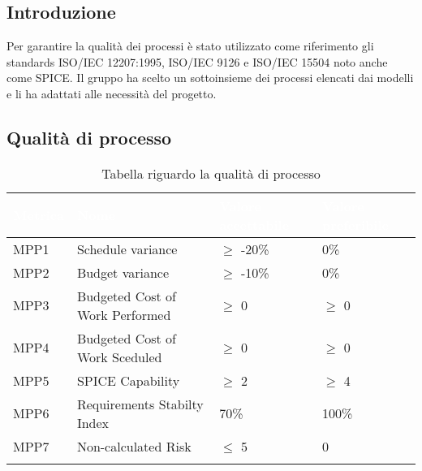 \subsection{Introduzione}
Per garantire la qualità dei processi è stato utilizzato come riferimento gli standards 
ISO/IEC 12207:1995, ISO/IEC 9126 e ISO/IEC 15504 noto anche come SPICE.
Il gruppo ha scelto un sottoinsieme dei processi elencati dai modelli e li ha adattati alle 
necessità del progetto.

\subsection{Qualità di processo}
{

    \setlength{\freewidth}{\dimexpr\textwidth-10\tabcolsep}
    \renewcommand{\arraystretch}{1.5}
    \centering
    \setlength{\aboverulesep}{0pt}
    \setlength{\belowrulesep}{0pt}
    \begin{longtable}{C{.257\freewidth} C{.257\freewidth} C{.257\freewidth} C{.257\freewidth}}
       \toprule
    \textcolor{white}{\textbf{Metrica}}&
    \textcolor{white}{\textbf{Nome}}&
    \textcolor{white}{\textbf{Valore accettabile}}&
    \textcolor{white}{\textbf{Valore preferibile}}\\	
    \toprule
    \endhead
    
    
    MPP1 & Schedule variance & $\geq$ -20\% & 0\% \\
    MPP2 & Budget variance & $\geq$ -10\% & 0\% \\
    MPP3 & Budgeted Cost of Work Performed & $\geq$ 0 & $\geq$ 0 \\
    MPP4 & Budgeted Cost of Work Sceduled & $\geq$ 0 & $\geq$ 0 \\
    MPP5 & SPICE Capability & $\geq$ 2 & $\geq$ 4 \\
    MPP6 & Requirements Stabilty Index & 70\% & 100\% \\
    MPP7 & Non-calculated Risk & $\leq$ 5 & 0 \\	   
    \bottomrule
    \caption{Tabella riguardo la qualità di processo}
    \end{longtable}
}

